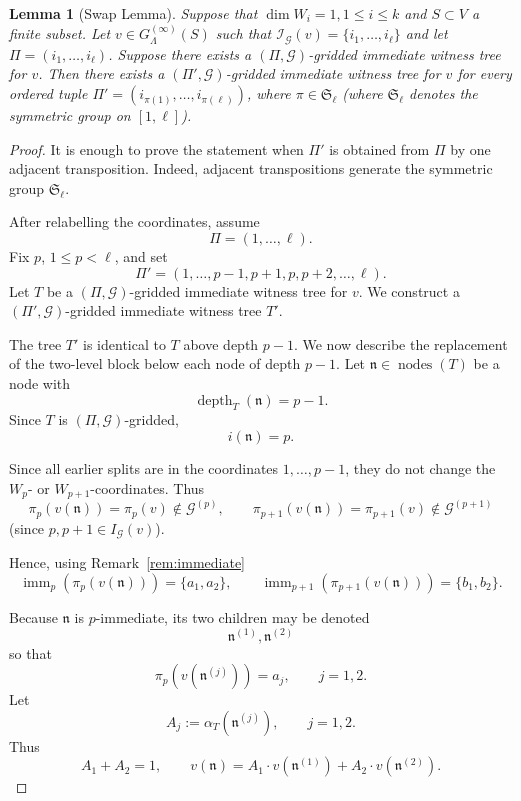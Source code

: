 \documentclass[10pt]{amsart}
\theoremstyle{plain}
\newtheorem{lemma}{Lemma}[section]
\theoremstyle{definition}
\providecommand{\cG}[0]{\ensuremath{\mathcal G}\xspace}
\providecommand{\cI}[0]{\ensuremath{\mathcal I}\xspace}
\let\leq\leqslant
\newcommand{\fn}{\mathfrak{n}}
\begin{document}
\begin{lemma}[Swap Lemma]
    \label{lem:permute}
    Suppose that $\dim W_i = 1, 1 \leq i \leq k$ and $S \subset V$ a finite subset.
    Let $v \in G^{(\infty)}_\Lambda(S)$ such that $\cI_\cG(v) =\{i_1,\ldots,i_\ell\}$ and let $\Pi=(i_1,\ldots,i_\ell)$.
    Suppose there exists a $(\Pi,\cG)$-gridded immediate witness tree for $v$. Then there exists a $(\Pi',\cG)$-gridded immediate witness tree for $v$ for every ordered tuple $\Pi'= (i_{\pi(1)},\ldots,i_{\pi(\ell)})$, where $\pi \in \mathfrak{S}_\ell$ (where $\mathfrak{S}_\ell$ denotes the symmetric group on $[1,\ell]$).
\end{lemma}

\begin{proof}
It is enough to prove the statement when $\Pi'$ is obtained from $\Pi$
by one adjacent transposition. Indeed, adjacent transpositions generate
the symmetric group $\mathfrak{S}_\ell$.

After relabelling the coordinates, assume
\[
        \Pi=(1,\ldots,\ell).
\]
Fix $p$, $1\le p<\ell$, and set
\[
        \Pi'=(1,\ldots,p-1,p+1,p,p+2,\ldots,\ell).
\]
Let $T$ be a $(\Pi,\mathcal G)$-gridded immediate witness tree for $v$.
We construct a $(\Pi',\mathcal G)$-gridded immediate witness tree $T'$.

The tree $T'$ is identical to $T$ above depth $p-1$. We now describe
the replacement of the two-level block below each node of depth $p-1$.
Let $\mathfrak{n}\in \operatorname{nodes}(T)$ be a node with
\[
        \operatorname{depth}_T(\fn)=p-1.
\]
Since $T$ is $(\Pi,\mathcal G)$-gridded, 
\[
i(\mathfrak{n}) = p.
\]

Since all earlier splits are in the coordinates
$1,\ldots,p-1$, they do not change the $W_p$- or $W_{p+1}$-coordinates.
Thus
\[
        \pi_p(v(\mathfrak{n}))=\pi_p(v) \not\in \cG^{(p)},\qquad
        \pi_{p+1}(v(\mathfrak{n}))=\pi_{p+1}(v) \not\in \cG^{(p+1)}
\]
(since $p,p+1\in I_{\mathcal G}(v)$).  

Hence, 
using Remark~\ref{rem:immediate}
\[
        \operatorname{imm}_p(\pi_p(v(\fn)))=\{a_1,a_2\},
        \qquad
        \operatorname{imm}_{p+1}(\pi_{p+1}(v(\fn)))=\{b_1,b_2\}.
\]

Because $\mathfrak{n}$ is $p$-immediate, its two children may be denoted
\[
        \mathfrak{n}^{(1)},\mathfrak{n}^{(2)}
\]
so that
\[
        \pi_p(v(\mathfrak{n}^{(j)}))=a_j,\qquad j=1,2.
\]
Let
\[
        A_j:=\alpha_T(\mathfrak{n}^{(j)}),\qquad j=1,2.
\]
Thus
\[
        A_1+A_2=1,
        \qquad
        v(\mathfrak{n})=A_1 \cdot v(\mathfrak{n}^{(1)})+A_2\cdot v(\mathfrak{n}^{(2)}).
\]


\end{proof}
\end{document}
